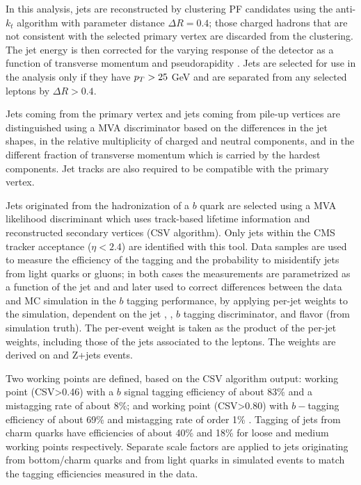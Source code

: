 In this analysis, jets are reconstructed by clustering PF candidates using the anti-$k_t$ algorithm with parameter distance $\Delta R=0.4$; those charged hadrons that are not consistent with the selected primary vertex are discarded from the clustering. The jet energy is then corrected for the varying response of the detector as a function of transverse momentum \pt and pseudorapidity \etac. Jets are selected for use in the analysis only if they have $p_T > 25$ GeV and are separated from any selected leptons by $\Delta R > 0.4$.

Jets coming from the primary vertex and jets coming from pile-up vertices are distinguished using a MVA discriminator based on the differences in the jet shapes, in the relative multiplicity of charged and neutral components, and in the different fraction of transverse momentum which is carried by the hardest components. Jet tracks are also required to be compatible with the primary
vertex.

Jets originated from the hadronization of a $b$ quark are selected using a MVA likelihood discriminant which uses track-based lifetime information and reconstructed secondary vertices (CSV algorithm). Only jets within the CMS tracker acceptance ($\eta < 2.4$) are identified with this tool. Data samples are used to measure the efficiency of the \bjet tagging and the probability to misidentify jets from light quarks or gluons; in both cases the measurements are parametrized as a function of the jet \pt and \etac and later used to correct differences between the data and MC simulation in the $b$ tagging performance, by applying per-jet weights to the simulation, dependent on the jet \pt, \etac, $b$ tagging discriminator, and flavor (from simulation truth)\cite{btag_corr}. The per-event weight is taken as the product of the per-jet weights, including those of the jets associated to the leptons. The weights are derived on \ttbar and Z+jets events.

Two working points are defined, based on the CSV algorithm output:  working point (CSV>0.46) with a $b$ signal tagging efficiency of about 83\% and a mistagging rate of about 8\%; and  working point (CSV>0.80) with $b-$tagging efficiency of about 69\% and mistagging rate of order 1\% \cite{btag_points}. Tagging of jets from charm quarks have efficiencies of about 40\%  and 18\% for loose and medium working points respectively. Separate scale factors are applied to jets originating from bottom/charm quarks and from light quarks in simulated events to match the tagging efficiencies measured in the data.


